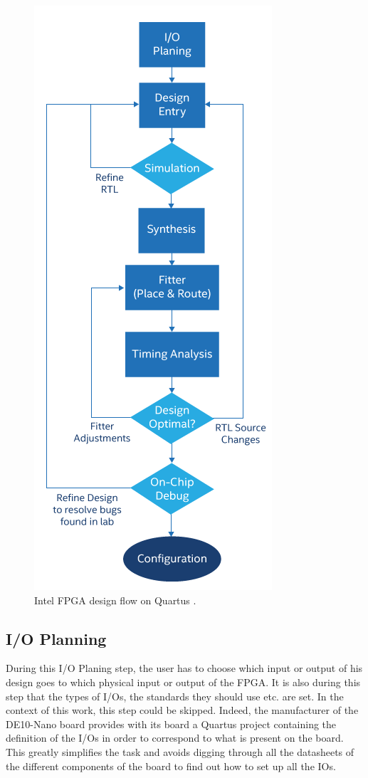 \begin{figure}[ht]
    \centering
    \includegraphics[scale=0.5]{Chapter2-FPGA_Flow/res/blockdiagram-quartus-flow.png}
    \caption{Intel FPGA design flow on Quartus \cite{quartus}.}
    \label{fig:flow/design_flow}
\end{figure}

\subsection{I/O Planning}

During this I/O Planing step, the user has to choose which input or output of his design goes to 
which physical input or output of the FPGA. It is also during this step that the types of I/Os, the 
standards they should use etc. are set. In the context of this work, this step could be skipped. 
Indeed, the manufacturer of the DE10-Nano board provides with its board a Quartus project 
containing the definition of the I/Os in order to correspond to what is present on the board. 
This greatly simplifies the task and avoids digging through all the datasheets of the different
components of the board to find out how to set up all the IOs.


